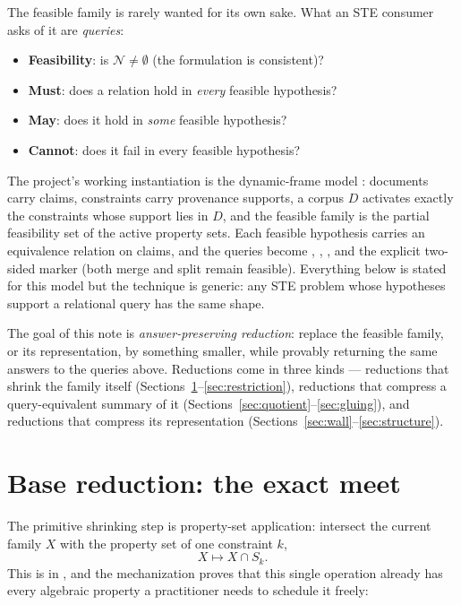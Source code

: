 \documentclass[11pt]{article}
\newcommand{\Feas}{\mathcal N}
\begin{document}
The feasible family is rarely wanted for its own sake.  What an STE
consumer asks of it are \emph{queries}:

\begin{itemize}
\item \textbf{Feasibility}: is $\Feas\neq\emptyset$ (the formulation is
  consistent)?
\item \textbf{Must}: does a relation hold in \emph{every} feasible
  hypothesis?
\item \textbf{May}: does it hold in \emph{some} feasible hypothesis?
\item \textbf{Cannot}: does it fail in every feasible hypothesis?
\end{itemize}

The project's working instantiation is the dynamic-frame model
: documents carry claims, constraints carry
provenance supports, a corpus $D$ activates exactly the constraints
whose support lies in $D$, and the feasible family
 is the partial feasibility set of the active
property sets.  Each feasible hypothesis carries an equivalence relation
on claims, and the queries become , ,
, and the explicit two-sided marker 
(both merge and split remain feasible).  Everything below is stated for
this model but the technique is generic: any STE problem whose
hypotheses support a relational query has the same shape.

The goal of this note is \emph{answer-preserving reduction}: replace the
feasible family, or its representation, by something smaller, while
provably returning the same answers to the queries above.  Reductions
come in three kinds --- reductions that shrink the family itself
(Sections~\ref{sec:meet}--\ref{sec:restriction}), reductions that
compress a query-equivalent summary of it
(Sections~\ref{sec:quotient}--\ref{sec:gluing}), and reductions that
compress its representation
(Sections~\ref{sec:wall}--\ref{sec:structure}).

\section{Base reduction: the exact meet}
\label{sec:meet}

The primitive shrinking step is property-set application: intersect the
current family $X$ with the property set of one constraint $k$,
\[
X \mapsto X \cap S_k .
\]
This is  in , and
the mechanization proves that this single operation already has every
algebraic property a practitioner needs to schedule it freely:
\end{document}
